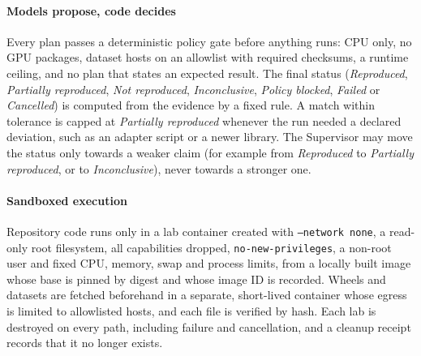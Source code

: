 \documentclass[preprint,12pt]{elsarticle}
\newcommand{\code}[1]{\texttt{#1}}
\begin{document}
\paragraph{Models propose, code decides}
Every plan passes a deterministic policy gate before anything runs: CPU only,
no GPU packages, dataset hosts on an allowlist with required checksums, a
runtime ceiling, and no plan that states an expected result. The final status
(\emph{Reproduced}, \emph{Partially reproduced}, \emph{Not reproduced},
\emph{Inconclusive}, \emph{Policy blocked}, \emph{Failed} or \emph{Cancelled})
is computed from the evidence by a fixed rule. A match within tolerance is
capped at \emph{Partially reproduced} whenever the run needed a declared
deviation, such as an adapter script or a newer library. The Supervisor may
move the status only towards a weaker claim (for example from \emph{Reproduced}
to \emph{Partially reproduced}, or to \emph{Inconclusive}), never towards a
stronger one.

\paragraph{Sandboxed execution}
Repository code runs only in a lab container created with
\code{--network none}, a read-only root filesystem, all capabilities dropped,
\code{no-new-privileges}, a non-root user and fixed CPU, memory, swap and
process limits, from a locally built image whose base is pinned by digest and
whose image ID is recorded. Wheels and datasets are fetched
beforehand in a separate, short-lived container whose egress is limited to
allowlisted hosts, and each file is verified by hash. Each lab is destroyed on
every path, including failure and cancellation, and a cleanup receipt records
that it no longer exists.
\end{document}
